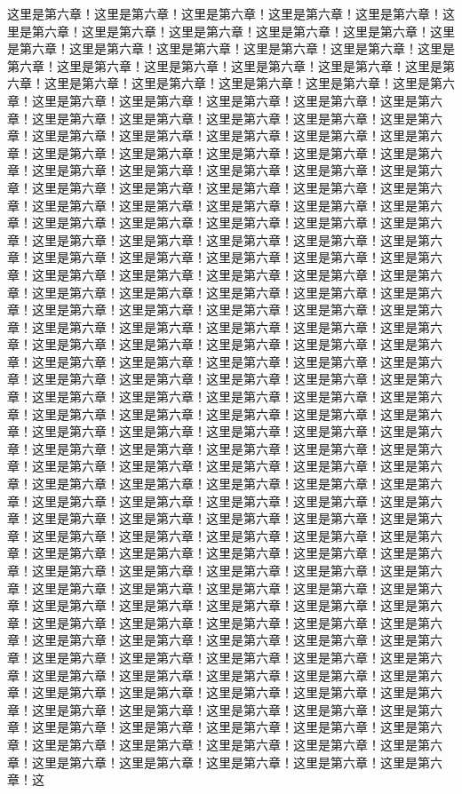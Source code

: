 
\label{sec6}
这里是第六章！这里是第六章！这里是第六章！这里是第六章！这里是第六章！这里是第六章！这里是第六章！这里是第六章！这里是第六章！这里是第六章！这里是第六章！这里是第六章！这里是第六章！这里是第六章！这里是第六章！这里是第六章！这里是第六章！这里是第六章！这里是第六章！这里是第六章！这里是第六章！这里是第六章！这里是第六章！这里是第六章！这里是第六章！这里是第六章！这里是第六章！这里是第六章！这里是第六章！这里是第六章！这里是第六章！这里是第六章！这里是第六章！这里是第六章！这里是第六章！这里是第六章！这里是第六章！这里是第六章！这里是第六章！这里是第六章！这里是第六章！这里是第六章！这里是第六章！这里是第六章！这里是第六章！这里是第六章！这里是第六章！这里是第六章！这里是第六章！这里是第六章！这里是第六章！这里是第六章！这里是第六章！这里是第六章！这里是第六章！这里是第六章！这里是第六章！这里是第六章！这里是第六章！这里是第六章！这里是第六章！这里是第六章！这里是第六章！这里是第六章！这里是第六章！这里是第六章！这里是第六章！这里是第六章！这里是第六章！这里是第六章！这里是第六章！这里是第六章！这里是第六章！这里是第六章！这里是第六章！这里是第六章！这里是第六章！这里是第六章！这里是第六章！这里是第六章！这里是第六章！这里是第六章！这里是第六章！这里是第六章！这里是第六章！这里是第六章！这里是第六章！这里是第六章！这里是第六章！这里是第六章！这里是第六章！这里是第六章！这里是第六章！这里是第六章！这里是第六章！这里是第六章！这里是第六章！这里是第六章！这里是第六章！这里是第六章！这里是第六章！这里是第六章！这里是第六章！这里是第六章！这里是第六章！这里是第六章！这里是第六章！这里是第六章！这里是第六章！这里是第六章！这里是第六章！这里是第六章！这里是第六章！这里是第六章！这里是第六章！这里是第六章！这里是第六章！这里是第六章！这里是第六章！这里是第六章！这里是第六章！这里是第六章！这里是第六章！这里是第六章！这里是第六章！这里是第六章！这里是第六章！这里是第六章！这里是第六章！这里是第六章！这里是第六章！这里是第六章！这里是第六章！这里是第六章！这里是第六章！这里是第六章！这里是第六章！这里是第六章！这里是第六章！这里是第六章！这里是第六章！这里是第六章！这里是第六章！这里是第六章！这里是第六章！这里是第六章！这里是第六章！这里是第六章！这里是第六章！这里是第六章！这里是第六章！这里是第六章！这里是第六章！这里是第六章！这里是第六章！这里是第六章！这里是第六章！这里是第六章！这里是第六章！这里是第六章！这里是第六章！这里是第六章！这里是第六章！这里是第六章！这里是第六章！这里是第六章！这里是第六章！这里是第六章！这里是第六章！这里是第六章！这里是第六章！这里是第六章！这里是第六章！这里是第六章！这里是第六章！这里是第六章！这里是第六章！这里是第六章！这里是第六章！这里是第六章！这里是第六章！这里是第六章！这里是第六章！这里是第六章！这里是第六章！这里是第六章！这里是第六章！这里是第六章！这里是第六章！这里是第六章！这里是第六章！这里是第六章！这里是第六章！这里是第六章！这里是第六章！这里是第六章！这里是第六章！这里是第六章！这里是第六章！这里是第六章！这里是第六章！这里是第六章！这里是第六章！这里是第六章！这里是第六章！这里是第六章！这里是第六章！这里是第六章！这里是第六章！这里是第六章！这里是第六章！这里是第六章！这里是第六章！这里是第六章！这里是第六章！这里是第六章！这里是第六章！这里是第六章！这里是第六章！这里是第六章！这里是第六章！这